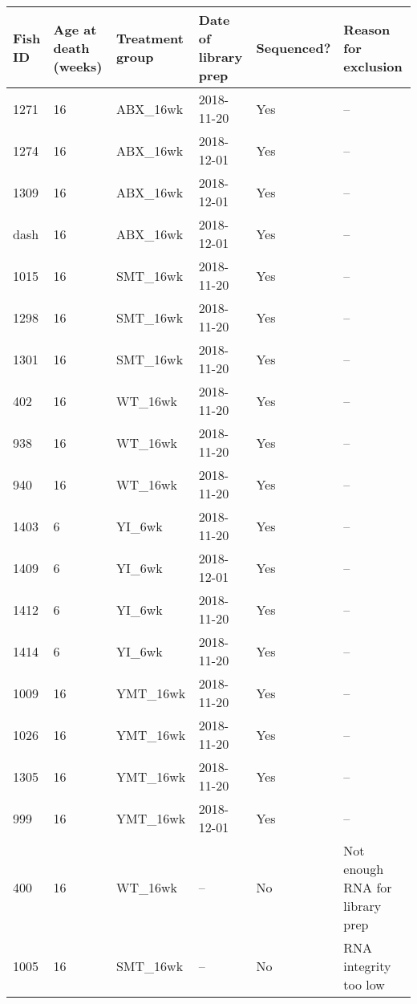 \begin{tabular}{llllll}
  \toprule Fish ID & Age at death (weeks) & Treatment group & Date of library prep & Sequenced? & Reason for exclusion \\ 
  \midrule 1271 & 16 & ABX\_16wk & 2018-11-20 & Yes & -- \\ 
  1274 & 16 & ABX\_16wk & 2018-12-01 & Yes & -- \\ 
  1309 & 16 & ABX\_16wk & 2018-12-01 & Yes & -- \\ 
  dash & 16 & ABX\_16wk & 2018-12-01 & Yes & -- \\ 
  1015 & 16 & SMT\_16wk & 2018-11-20 & Yes & -- \\ 
  1298 & 16 & SMT\_16wk & 2018-11-20 & Yes & -- \\ 
  1301 & 16 & SMT\_16wk & 2018-11-20 & Yes & -- \\ 
  402 & 16 & WT\_16wk & 2018-11-20 & Yes & -- \\ 
  938 & 16 & WT\_16wk & 2018-11-20 & Yes & -- \\ 
  940 & 16 & WT\_16wk & 2018-11-20 & Yes & -- \\ 
  1403 &  6 & YI\_6wk & 2018-11-20 & Yes & -- \\ 
  1409 &  6 & YI\_6wk & 2018-12-01 & Yes & -- \\ 
  1412 &  6 & YI\_6wk & 2018-11-20 & Yes & -- \\ 
  1414 &  6 & YI\_6wk & 2018-11-20 & Yes & -- \\ 
  1009 & 16 & YMT\_16wk & 2018-11-20 & Yes & -- \\ 
  1026 & 16 & YMT\_16wk & 2018-11-20 & Yes & -- \\ 
  1305 & 16 & YMT\_16wk & 2018-11-20 & Yes & -- \\ 
  999 & 16 & YMT\_16wk & 2018-12-01 & Yes & -- \\ 
  400 & 16 & WT\_16wk & -- & No & Not enough RNA for library prep \\ 
  1005 & 16 & SMT\_16wk & -- & No & RNA integrity too low \\ 
   \bottomrule \end{tabular}

